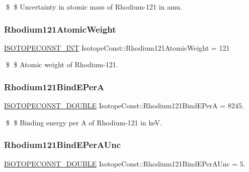 \$ \$ Uncertainty in atomic mass of Rhodium-\/121 in amu. \mbox{\label{group___isotope_const-_rhodium-_rh121_ga11f5b4521c55b3405a3ca0584f83850a}} 
\subsubsection{\texorpdfstring{Rhodium121\+Atomic\+Weight}{Rhodium121AtomicWeight}}
{\footnotesize\ttfamily \mbox{\hyperlink{group___isotope_const-_macros_ga5f18360b3e99483a35c32d789e62621c}{I\+S\+O\+T\+O\+P\+E\+C\+O\+N\+S\+T\+\_\+\+I\+NT}} Isotope\+Const\+::\+Rhodium121\+Atomic\+Weight = 121}

\$ \$ Atomic weight of Rhodium-\/121. \mbox{\label{group___isotope_const-_rhodium-_rh121_ga1360fd79ef0b1c4bcc3f90029165e787}} 
\subsubsection{\texorpdfstring{Rhodium121\+Bind\+E\+PerA}{Rhodium121BindEPerA}}
{\footnotesize\ttfamily \mbox{\hyperlink{group___isotope_const-_macros_ga8f45a7272ce02c0b4c65c44636ed719a}{I\+S\+O\+T\+O\+P\+E\+C\+O\+N\+S\+T\+\_\+\+D\+O\+U\+B\+LE}} Isotope\+Const\+::\+Rhodium121\+Bind\+E\+PerA = 8245.}

\$ \$ Binding energy per A of Rhodium-\/121 in keV. \mbox{\label{group___isotope_const-_rhodium-_rh121_gaa68bc1400471834ff74c88ac5b5c82e2}} 
\subsubsection{\texorpdfstring{Rhodium121\+Bind\+E\+Per\+A\+Unc}{Rhodium121BindEPerAUnc}}
{\footnotesize\ttfamily \mbox{\hyperlink{group___isotope_const-_macros_ga8f45a7272ce02c0b4c65c44636ed719a}{I\+S\+O\+T\+O\+P\+E\+C\+O\+N\+S\+T\+\_\+\+D\+O\+U\+B\+LE}} Isotope\+Const\+::\+Rhodium121\+Bind\+E\+Per\+A\+Unc = 5.}

